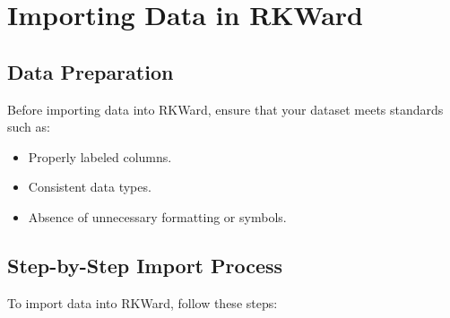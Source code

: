 \documentclass[
  letterpaper,
  DIV=11,
  numbers=noendperiod]{scrreprt}
\providecommand{\tightlist}{%
  \setlength{\itemsep}{0pt}\setlength{\parskip}{0pt}}
\begin{document}
\chapter{Importing Data in RKWard}\label{importing-data-in-rkward}

\section{Data Preparation}\label{data-preparation}

Before importing data into RKWard, ensure that your dataset meets
standards such as:

\begin{itemize}
\tightlist
\item
  Properly labeled columns.
\item
  Consistent data types.
\item
  Absence of unnecessary formatting or symbols.
\end{itemize}

\section{Step-by-Step Import Process}\label{step-by-step-import-process}

To import data into RKWard, follow these steps:
\end{document}

